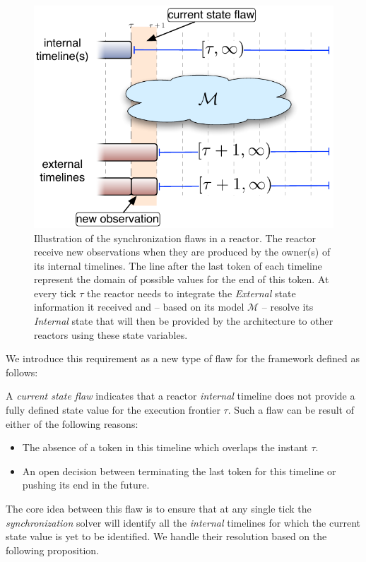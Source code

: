 \begin{figure}[!htbp]
  \centering
  \includegraphics[width=0.5\columnwidth]{figs/synch-relation}
  \caption{\small Illustration of the synchronization flaws in a reactor. The
    reactor receive new observations when they are produced by the
    owner(s) of its internal timelines. The line after the last token
    of each timeline represent the domain of possible values for the
    end of this token. At every tick $\tau$ the reactor needs to
    integrate the {\em External} state information it received and --
    based on its model $\mathcal{M}$ -- resolve its {\em Internal}
    state that will then be provided by the architecture to other
    reactors using these state variables.}
  \label{fig:synch:flaw}
\end{figure}

We introduce this requirement as a new type of flaw for the \eu
framework defined as follows:

\begin{definition}
  \label{def:csf}
  A {\em current state flaw} indicates that a reactor {\em internal}
  timeline does not provide a fully defined state value for the
  execution frontier $\tau$. Such a flaw can be result of either of
  the following reasons:

  \begin{itemize}
  \item The absence of a token in this timeline which overlaps the
    instant $\tau$.
  \item An open decision between terminating the last token for this
    timeline or pushing its end in the future.
  \end{itemize}

\end{definition}

The core idea between this flaw is to ensure that at any single tick
the {\em synchronization} solver will identify all the {\em internal}
timelines for which the current state value is yet to be
identified. We handle their resolution based on the following
proposition.

